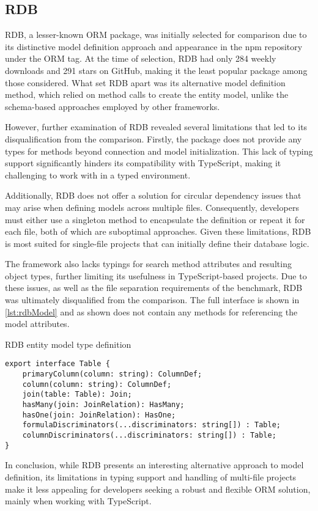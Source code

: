 \subsection{RDB}

RDB, a lesser-known ORM package, was initially selected for comparison due to
its distinctive model definition approach and appearance in the npm repository
under the ORM tag. At the time of selection, RDB had only 284 weekly downloads
and 291 stars on GitHub, making it the least popular package among those
considered. What set RDB apart was its alternative model definition method,
which relied on method calls to create the entity model, unlike the schema-based
approaches employed by other frameworks.

However, further examination of RDB revealed several limitations that led to its
disqualification from the comparison. Firstly, the package does not provide any
types for methods beyond connection and model initialization. This lack of
typing support significantly hinders its compatibility with TypeScript, making
it challenging to work with in a typed environment.

Additionally, RDB does not offer a solution for circular dependency issues that
may arise when defining models across multiple files. Consequently, developers
must either use a singleton method to encapsulate the definition or repeat it
for each file, both of which are suboptimal approaches. Given these limitations,
RDB is most suited for single-file projects that can initially define their
database logic.

The framework also lacks typings for search method attributes and resulting
object types, further limiting its usefulness in TypeScript-based projects. Due
to these issues, as well as the file separation requirements of the benchmark,
RDB was ultimately disqualified from the comparison. The full interface is shown
in \autoref{lst:rdbModel} and as shown does not contain any methods for
referencing the model attributes.

\begin{listing}
\caption{RDB entity model type definition}
\label{lst:rdbModel}
\begin{verbatim}
export interface Table {
    primaryColumn(column: string): ColumnDef;
    column(column: string): ColumnDef;
    join(table: Table): Join;
    hasMany(join: JoinRelation): HasMany;
    hasOne(join: JoinRelation): HasOne;
    formulaDiscriminators(...discriminators: string[]) : Table;
    columnDiscriminators(...discriminators: string[]) : Table;
}
\end{verbatim}
\end{listing}

In conclusion, while RDB presents an interesting alternative approach to model
definition, its limitations in typing support and handling of multi-file
projects make it less appealing for developers seeking a robust and flexible ORM
solution, mainly when working with TypeScript.